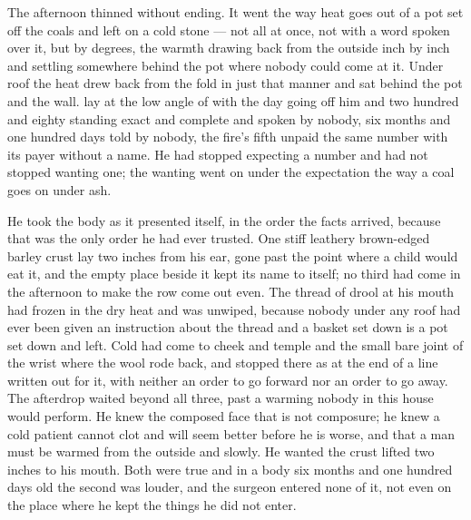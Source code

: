 The afternoon thinned without ending. It went the way heat goes out of a pot set off the coals and left on a cold stone --- not all at once, not with a word spoken over it, but by degrees, the warmth drawing back from the outside inch by inch and settling somewhere behind the pot where nobody could come at it. Under  roof the heat drew back from the fold in just that manner and sat behind the pot and the wall.  lay at the low angle of  with the day going off him and two hundred and eighty standing exact and complete and spoken by nobody, six months and one hundred days told by nobody, the fire's fifth unpaid the same number with its payer without a name. He had stopped expecting a number and had not stopped wanting one; the wanting went on under the expectation the way a coal goes on under ash.

He took the body as it presented itself, in the order the facts arrived, because that was the only order he had ever trusted. One stiff leathery brown-edged barley crust lay two inches from his ear, gone past the point where a child would eat it, and the empty place beside it kept its name to itself; no third had come in the afternoon to make the row come out even. The thread of drool at his mouth had frozen in the dry heat and was unwiped, because nobody under any roof had ever been given an instruction about the thread and a basket set down is a pot set down and left. Cold had come to cheek and temple and the small bare joint of the wrist where the wool rode back, and stopped there as at the end of a line written out for it, with neither an order to go forward nor an order to go away. The afterdrop waited beyond all three, past a warming nobody in this house would perform. He knew the composed face that is not composure; he knew a cold patient cannot clot and will seem better before he is worse, and that a man must be warmed from the outside and slowly. He wanted the crust lifted two inches to his mouth. Both were true and in a body six months and one hundred days old the second was louder, and the surgeon entered none of it, not even on the place where he kept the things he did not enter.

